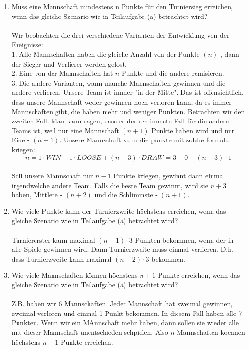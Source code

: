 \begin{enumerate}[label=(\alph*)]
        \item Muss eine Mannschaft mindestens n Punkte für den Turniersieg erreichen, wenn das
		gleiche Szenario wie in Teilaufgabe (a) betrachtet wird? \\ \\
         Wir beobachten die drei verschiedene Varianten der Entwicklung von der Ereignisse: \\
        1. Alle Mannschaften haben die gleiche Anzahl von der Punkte $(n)$ , dann der Sieger und Verlierer werden gelost. \\
        2. Eine von der Mannschaften hat $n$ Punkte und die andere remisieren. \\
        3. Die andere Varianten, wann manche Mannschaften gewinnen und die andere verlieren. Unsere Team ist immer "in der Mitte". Das ist offensichtlich, dass unsere Mannschaft weder gewinnen noch verloren kann, da es immer Mannschaften gibt, die haben mehr und weniger Punkten.
        	Betrachten wir den zweiten Fall. Man kann sagen, dass es der schlimmste Fall für die andere Teams ist, weil nur eine Mannschaft  $(n+1)$ Punkte haben wird und nur Eine - $(n-1)$. Unsere Mannschaft kann die punkte mit solche formula kriegen:
        	$$n= 1 \cdot WIN + 1\cdot LOOSE + (n-3) \cdot DRAW = 3 + 0 + (n-3)\cdot 1 $$ \\
        	Soll unsere Mannschaft nur $n-1$ Punkte kriegen, gewinnt dann einmal irgendwelche andere Team. Falls die beste Team gewinnt, wird sie $n+3$ haben, Mittlere - $(n+2)$ und die Schlimmste - $(n+1)$.
        
        \item Wie viele Punkte kann der Turnierzweite höchstens erreichen, wenn das gleiche Szenario
		wie in Teilaufgabe (a) betrachtet wird? \\\\
		Turniererster kann maximal $(n-1)\cdot 3$ Punkten bekommen, wenn der in alle Spiele gewinnen 
		wird. Dann Turnierzweite muss einmal verlieren. D.h. dass Turnierzweite kann maximal 
		$(n-2)\cdot 3$ bekommen.
        
        \item Wie viele Mannschaften können höchstens $n + 1$ Punkte erreichen, wenn das gleiche
		Szenario wie in Teilaufgabe (a) betrachtet wird? \\\\
		Z.B. haben wir 6 Mannschaften. Jeder Mannschaft hat zweimal gewinnen, zweimal verloren und
		einmal 1 Punkt bekommen. In diesem Fall haben alle 7 Punkten. Wenn wir ein MAnnschaft mehr haben,
		dann sollen sie wieder alle mit dieser Mannschaft unentschieden schpielen.
		Also $n$ Mannschaften koennen höchstens $n + 1$ Punkte erreichen.
        

\end{enumerate}
